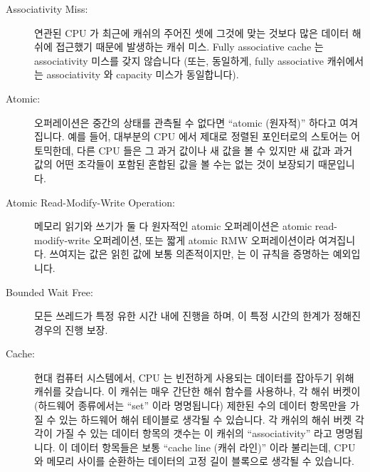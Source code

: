 \begin{description}
\item[Associativity Miss:]
	연관된 CPU 가 최근에 캐쉬의 주어진 셋에 그것에 맞는 것보다 많은 데이터
	해쉬에 접근했기 때문에 발생하는 캐쉬 미스.
	Fully associative cache 는 associativity 미스를 갖지 않습니다 (또는,
	동일하게, fully associative 캐쉬에서는 associativity 와 capacity 미스가
	동일합니다).
\item[Atomic:]
	오퍼레이션은 중간의 상태를 관측될 수 없다면 ``atomic (원자적)'' 하다고
	여겨집니다.
	예를 들어, 대부분의 CPU 에서 제대로 정렬된 포인터로의 스토어는
	어토믹한데, 다른 CPU 들은 그 과거 값이나 새 값을 볼 수 있지만 새 값과
	과거 값의 어떤 조각들이 포함된 혼합된 값을 볼 수는 없는 것이 보장되기
	때문입니다.
\item[Atomic Read-Modify-Write Operation:]
	메모리 읽기와 쓰기가 둘 다 원자적인 atomic 오퍼레이션은 atomic
	read-modify-write 오퍼레이션, 또는 짧게 atomic RMW 오퍼레이션이라
	여겨집니다.
	쓰여지는 값은 읽힌 값에 보통 의존적이지만,  는 이
	규칙을 증명하는 예외입니다.

\iffalse

\item[Associativity Miss:]\index{Associativity miss}
	A cache miss incurred because the corresponding CPU has recently
	accessed more data hashing to a given set of the cache than will
	fit in that set.
	Fully associative caches are not subject to associativity misses
	(or, equivalently, in fully associative caches, associativity
	and capacity misses are identical).
\item[Atomic:]\index{Atomic}
	An operation is considered ``atomic'' if it is not possible to
	observe any intermediate state.
	For example, on most CPUs, a store to a properly aligned pointer
	is atomic, because other CPUs will see either the old value or
	the new value, but are guaranteed not to see some mixed value
	containing some pieces of the new and old values.
\item[Atomic Read-Modify-Write Operation:]\index{Atomic read-modify-write operation}
	An atomic operation that both reads and writes memory is
	considered an atomic read-modify-write operation, or atomic RMW
	operation for short.
	Although the value written usually depends on the value read,
	\co{atomic_xchg()} is the exception that proves this rule.

\fi

\item[Bounded Wait Free:]
	모든 쓰레드가 특정 유한 시간 내에 진행을 하며, 이 특정 시간의 한계가
	정해진 경우의 진행 보장.
\item[Cache:]
	현대 컴퓨터 시스템에서, CPU 는 빈전하게 사용되는 데이터를 잡아두기 위해
	캐쉬를 갖습니다.
	이 캐쉬는 매우 간단한 해쉬 함수를 사용하나, 각 해쉬 버켓이 (하드웨어
	종류에서는 ``set'' 이라 명명됩니다) 제한된 수의 데이터 항목만을 가질 수
	있는 하드웨어 해쉬 테이블로 생각될 수 있습니다.
	각 캐쉬의 해쉬 버켓 각각이 가질 수 있는 데이터 항목의 갯수는 이 캐쉬의
	``associativity'' 라고 명명됩니다.
	이 데이터 항목들은 보통 ``cache line (캐쉬 라인)'' 이라 불리는데, CPU
	와 메모리 사이를 순환하는 데이터의 고정 길이 블록으로 생각될 수
	있습니다.


\end{description}
